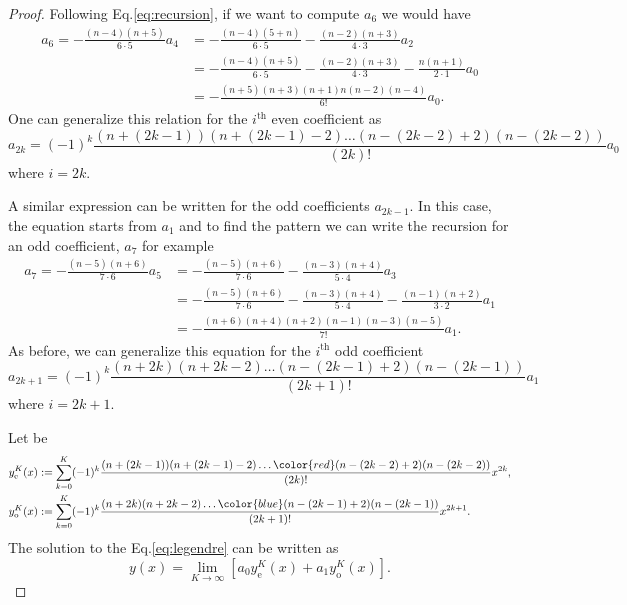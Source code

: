 \begin{proof}
    Following Eq.\eqref{eq:recursion}, if we want to compute $a_6$ we would have
    \begin{align*}
    a_{6}= -\frac{(n-4)(n+5)}{6\cdot 5}a_4 &= -\frac{(n-4)(5+n)}{6 \cdot 5} -\frac{(n-2)(n+3)}{4 \cdot 3}  a_2 \\
    &= -\frac{(n-4)(n+5)}{6 \cdot 5} -\frac{(n-2)(n+3)}{4 \cdot 3} -\frac{n(n+1)}{2 \cdot 1}  a_0 \\
    &= -\frac{(n+5)(n+3)(n+1)n(n-2)(n-4)}{6!} a_0.
    \end{align*}
    One can generalize this relation for the $i^\text{th}$ even coefficient as
    \begin{equation*}
    a_{2k} = (-1)^k \frac{(n+(2k-1))(n+(2k-1)-2)\hdots (n-(2k-2)+2)(n-(2k-2))}{(2k)!}a_0
    \end{equation*}
    where $i=2k$.
    
    A similar expression can be written for the odd coefficients $a_{2k-1}$. In this case, the equation starts from $a_1$ and to find the pattern we can write the recursion for an odd coefficient, $a_7$ for example
    \begin{align*}
    a_{7}= -\frac{(n-5)(n+6)}{7\cdot 6}a_5 &= - \frac{(n-5)(n+6)}{7\cdot 6} -\frac{(n-3)(n+4)}{5 \cdot 4}  a_3 \\
    &= - \frac{(n-5)(n+6)}{7\cdot 6} -\frac{(n-3)(n+4)}{5 \cdot 4}  -\frac{(n-1)(n+2)}{3 \cdot 2}  a_1 \\
    &= -\frac{(n+6)(n+4)(n+2)(n-1)(n-3)(n-5)}{7!} a_1.
    \end{align*}
    As before, we can generalize this equation for the $i^\text{th}$ odd coefficient
    \begin{equation*}
    a_{2k+1} = (-1)^k \frac{(n + 2k)(n+2k-2)\hdots(n-(2k-1)+2)(n-(2k-1))}{(2k+1)!}a_1
    \end{equation*}
    where $i=2k+1$.
    
    Let be 
    \begin{align*}
    y_\text{e}^K(x) &:= \sum_{k=0}^K(-1)^k \frac{(n+(2k-1))(n+(2k-1)-2)\hdots \color{red}(n-(2k-2)+2)(n-(2k-2))}{(2k)!} x^{2k}, \\
    y_\text{o}^K(x) &:= \sum_{k=0}^K(-1)^k \frac{(n + 2k)(n+2k-2)\hdots \color{blue} (n-(2k-1)+2)(n-(2k-1))}{(2k+1)!} x^{2k+1}.
    \end{align*}
    The solution to the Eq.\eqref{eq:legendre} can be written as
    \begin{equation}\label{eq:solution}
    y(x) = \lim_{K \to \infty} \left[ a_0 y_\text{e}^K(x) + a_1 y_\text{o}^K(x) \right].
    \end{equation}
    

\end{proof}
